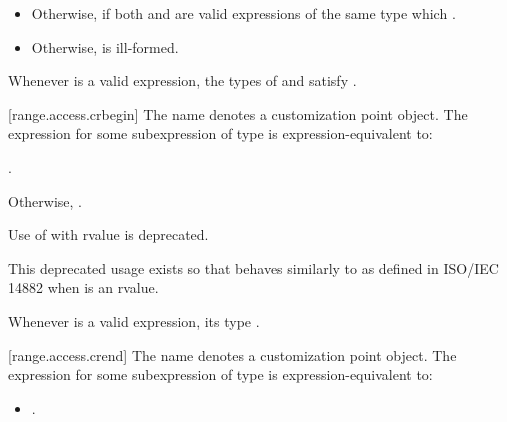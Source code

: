 {\begin{itemize}
\item
  Otherwise,  if both
   and  are valid expressions
  of the same type  which  
  .

\item
  Otherwise,  is ill-formed.
\end{itemize}

\pnum
\begin{note}
Whenever  is a valid expression, the
types of  and  satisfy
.
\end{note}

[range.access.crbegin]{}
\pnum
The name  denotes a customization point
object. The expression
 for some subexpression  of type 
is expression-equivalent to:
\begin{itemize}
\item {} .
{\color{newclr}
\item Otherwise, .
} %
\end{itemize}

{\color{oldclr}
\pnum
Use of  with rvalue  is deprecated.
\begin{note}
This deprecated usage exists so that 
behaves similarly to  as defined in ISO/IEC 14882 when
 is an rvalue.
\end{note}
} %

\pnum
\begin{note}
Whenever  is a valid expression, its
type   .
\end{note}

[range.access.crend]{}
\pnum
The name  denotes a customization point
object. The expression
 for some subexpression  of type 
is expression-equivalent to:
\begin{itemize}
\item {} .


\end{itemize}}
